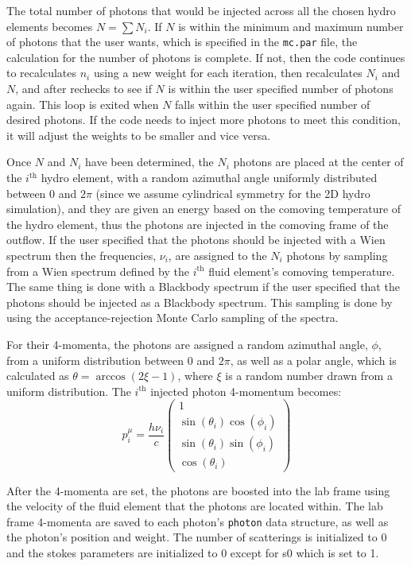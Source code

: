 \documentclass[12pt,a4paper]{article}
\begin{document}
The total number of photons that would be injected across all the chosen hydro elements becomes $N=\sum N_i$. If $N$ is within the minimum and maximum number of photons that the user wants, which is specified in the \texttt{mc.par} file, the calculation for the number of photons is complete. If not, then the code continues to recalculates $n_i$ using a new weight for each iteration, then recalculates $N_i$ and $N$, and after rechecks to see if $N$ is within the user specified number of photons again. This loop is exited when $N$ falls within the user specified number of desired photons. If the code needs to inject more photons to meet this condition, it will adjust the weights to be smaller and vice versa.

Once $N$ and $N_i$ have been determined, the $N_i$ photons are placed at the center of the $i^\mathrm{th}$ hydro element, with a random azimuthal angle uniformly distributed between $0$ and $2\pi$ (since we assume cylindrical symmetry for the 2D hydro simulation), and they are given an energy based on the comoving temperature of the hydro element, thus the photons are injected in the comoving frame of the outflow. If the user specified that the photons should be injected with a Wien spectrum then the frequencies, $\nu_i$, are assigned to the $N_i$ photons by sampling from a Wien spectrum defined by the $i^\mathrm{th}$ fluid element's comoving temperature. The same thing is done with a Blackbody spectrum if the user specified that the photons should be injected as a Blackbody spectrum. This sampling is done by using the acceptance-rejection Monte Carlo sampling of the spectra.

For their 4-momenta, the photons are assigned a random azimuthal angle, $\phi$, from a uniform distribution between $0$ and $2\pi$, as well as a polar angle, which is calculated as $\theta=\arccos(2\xi-1)$, where $\xi$ is a random number drawn from a uniform distribution. The $i^\mathrm{th}$ injected photon 4-momentum becomes:
\[
p^\mu_i=\frac{h\nu_i}{c}\begin{pmatrix}
1 \\ \sin(\theta_i) \cos(\phi_i) \\ \sin(\theta_i) \sin(\phi_i) \\ \cos(\theta_i)
\end{pmatrix}
\]

After the 4-momenta are set, the photons are boosted into the lab frame using the velocity of the fluid element that the photons are located within. The lab frame 4-momenta are saved to each photon's \texttt{photon} data structure, as well as the photon's position and weight. The number of scatterings is initialized to 0 and the stokes parameters are initialized to 0 except for s0 which is set to 1.
\end{document}
